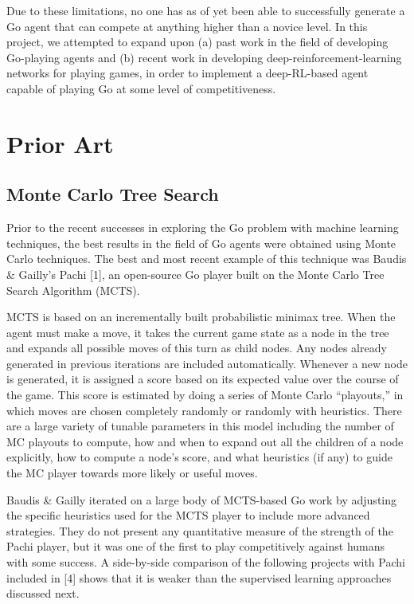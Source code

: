 Due to these limitations, no one has as of yet been able to successfully generate a Go agent that can compete at anything higher than a novice level. In this project, we attempted to expand upon (a) past work in the field of developing Go-playing agents and (b) recent work in developing deep-reinforcement-learning networks for playing games, in order to implement a deep-RL-based agent capable of playing Go at some level of competitiveness.

\section{Prior Art}
\label{gen_inst}

\subsection*{Monte Carlo Tree Search}
Prior to the recent successes in exploring the Go problem with machine learning techniques, the best results in the field of Go agents were obtained using Monte Carlo techniques. The best and most recent example of this technique was Baudis \& Gailly's Pachi [1], an open-source Go player built on the Monte Carlo Tree Search Algorithm (MCTS).

MCTS is based on an incrementally built probabilistic minimax tree. When the agent must make a move, it takes the current game state as a node in the tree and expands all possible moves of this turn as child nodes. Any nodes already generated in previous iterations are included automatically. Whenever a new node is generated, it is assigned a score based on its expected value over the course of the game. This score is estimated by doing a series of Monte Carlo ``playouts,'' in which moves are chosen completely randomly or randomly with heuristics. There are a large variety of tunable parameters in this model including the number of MC playouts to compute, how and when to expand out all the children of a node explicitly, how to compute a node's score, and what heuristics (if any) to guide the MC player towards more likely or useful moves.

Baudis \& Gailly iterated on a large body of MCTS-based Go work by adjusting the specific heuristics used for the MCTS player to include more advanced strategies. They do not present any quantitative measure of the strength of the Pachi player, but it was one of the first to play competitively against humans with some success. A side-by-side comparison of the following projects with Pachi included in [4] shows that it is weaker than the supervised learning approaches discussed next.

